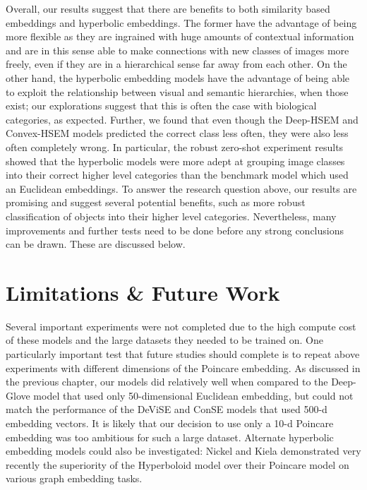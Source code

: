 \documentclass[12pt]{report}
\begin{document}
Overall, our results suggest that there are benefits to both similarity based embeddings and hyperbolic embeddings. The former have the advantage of being more flexible as they are ingrained with huge amounts of contextual information and are in this sense able to make connections with new classes of images more freely, even if they are in a hierarchical sense far away from each other. On the other hand, the hyperbolic embedding models have the advantage of being able to exploit the relationship between visual and semantic hierarchies, when those exist; our explorations suggest that this is often the case with biological categories, as expected. Further, we found that even though the Deep-HSEM and Convex-HSEM models predicted the correct class less often, they were also less often completely wrong. In particular, the robust zero-shot experiment results showed that the hyperbolic models were more adept at grouping image classes into their correct higher level categories than the benchmark model which used an Euclidean embeddings. To answer the research question above, our results are promising and suggest several potential benefits, such as more robust classification of objects into their higher level categories. Nevertheless, many improvements and further tests need to be done before any strong conclusions can be drawn. These are discussed below.


\section{Limitations \& Future Work}

Several important experiments were not completed due to the high compute cost of these models and the large datasets they needed to be trained on. One particularly important test that future studies should complete is to repeat above experiments with different dimensions of the Poincare embedding. As discussed in the previous chapter, our models did relatively well when compared to the Deep-Glove model that used only 50-dimensional Euclidean embedding, but could not match the performance of the DeViSE and ConSE models that used 500-d embedding vectors. It is likely that our decision to use only a 10-d Poincare embedding was too ambitious for such a large dataset. Alternate hyperbolic embedding models could also be investigated: Nickel and Kiela \cite{Nickel2018} demonstrated very recently the superiority of the Hyperboloid model over their Poincare model on various graph embedding tasks.
\end{document}
